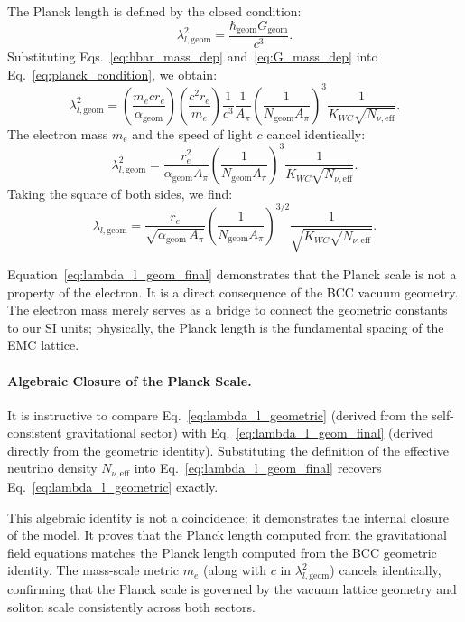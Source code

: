 \documentclass[10pt,a4paper]{article}
\begin{document}
The Planck length is defined by the closed condition:
\begin{equation}
	\lambda_{l,\text{geom}}^2 = \frac{\hbar_{\text{geom}} G_{\text{geom}}}{c^3}.
	\label{eq:planck_condition}
\end{equation}
Substituting Eqs.~\eqref{eq:hbar_mass_dep} and~\eqref{eq:G_mass_dep} into Eq.~\eqref{eq:planck_condition}, we obtain:
\begin{equation}
	\lambda_{l,\text{geom}}^2 = 
	\left( \frac{m_e c r_e}{\alpha_{\text{geom}}} \right)
	\left( \frac{c^2 r_e}{m_e} \right)
	\frac{1}{c^3}
	\frac{1}{A_\pi} \left(\frac{1}{N_{\text{geom}} A_\pi}\right)^3 \frac{1}{K_{WC} \sqrt{N_{\nu,\text{eff}}}}.
\end{equation}
The electron mass \(m_e\) and the speed of light \(c\) cancel identically:
\begin{equation}
	\lambda_{l,\text{geom}}^2 = 
	\frac{r_e^2}{\alpha_{\text{geom}} A_\pi}
	\left(\frac{1}{N_{\text{geom}} A_\pi}\right)^3 \frac{1}{K_{WC} \sqrt{N_{\nu,\text{eff}}}}.
	\label{eq:planck_no_mass}
\end{equation}
Taking the square of both sides, we find:
\begin{equation}
	\boxed{
		\lambda_{l,\text{geom}} = \frac{r_e}{\sqrt{\alpha_{\text{geom}} \, A_\pi}} \left(\frac{1}{N_{\text{geom}} A_\pi}\right)^{3/2} \frac{1}{\sqrt{K_{WC} \sqrt{N_{\nu,\text{eff}}}}}.
	}
	\label{eq:lambda_l_geom_final}
\end{equation}

Equation~\eqref{eq:lambda_l_geom_final} demonstrates that the Planck scale is not a property of the electron. It is a direct consequence of the BCC vacuum geometry. The electron mass merely serves as a bridge to connect the geometric constants to our SI units; physically, the Planck length is the fundamental spacing of the EMC lattice.

\paragraph{Algebraic Closure of the Planck Scale.}
It is instructive to compare Eq.~\eqref{eq:lambda_l_geometric} (derived from the self-consistent gravitational sector) with Eq.~\eqref{eq:lambda_l_geom_final} (derived directly from the geometric identity). Substituting the definition of the effective neutrino density \(N_{\nu,\text{eff}}\) into Eq.~\eqref{eq:lambda_l_geom_final} recovers Eq.~\eqref{eq:lambda_l_geometric} exactly. 

This algebraic identity is not a coincidence; it demonstrates the internal closure of the model. It proves that the Planck length computed from the gravitational field equations matches the Planck length computed from the BCC geometric identity. The mass-scale metric \(m_e\) (along with \(c\) in \(\lambda_{l,\text{geom}}^2\)) cancels identically, confirming that the Planck scale is governed by the vacuum lattice geometry and soliton scale consistently across both sectors.
\end{document}
